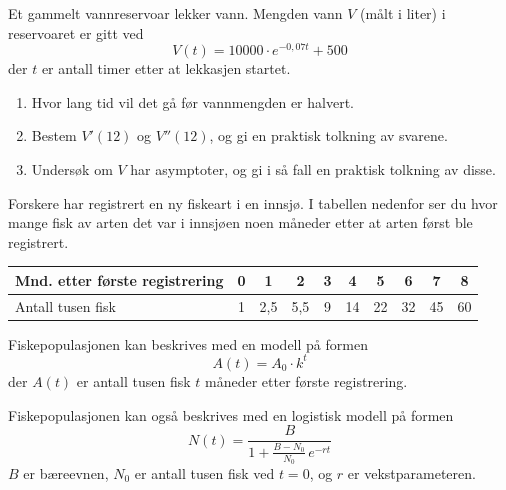 Et gammelt vannreservoar lekker vann. Mengden vann $V$ (målt i liter) i reservoaret er gitt ved
\[
V(t) = 10000 \cdot e^{-0,07t} + 500
\]
der $t$ er antall timer etter at lekkasjen startet.

\begin{enumerate}[label=\alph*)]
	\item Hvor lang tid vil det gå før vannmengden er halvert.
	\item Bestem $V'(12)$ og $V''(12)$, og gi en praktisk tolkning av svarene.
	\item Undersøk om $V$ har asymptoter, og gi i så fall en praktisk tolkning av disse.
\end{enumerate}

Forskere har registrert en ny fiskeart i en innsjø. I tabellen nedenfor ser
du hvor mange fisk av arten det var i innsjøen noen måneder etter at arten
først ble registrert.
\begin{center}
	\small
	\begin{tabular}{|l|c|c|c|c|c|c|c|c|c|}
		\hline
		Mnd. etter første registrering & 0 & 1 & 2 & 3 & 4 & 5 & 6 & 7 & 8 \\
		\hline
		Antall tusen fisk & 1 & 2,5 & 5,5 & 9 & 14 & 22 & 32 & 45 & 60 \\
		\hline
	\end{tabular}
\end{center}

Fiskepopulasjonen kan beskrives med en modell på formen
\[
A(t) = A_0 \cdot k^t
\]
der $A(t)$ er antall tusen fisk $t$ måneder etter første registrering.


Fiskepopulasjonen kan også beskrives med en logistisk modell på formen
\[
N(t) = \frac{B}{1 + \frac{B - N_0}{N_0}\, e^{-rt}}
\]
$B$ er bæreevnen, $N_0$ er antall tusen fisk ved $t = 0$, og $r$ er
vekstparameteren.



